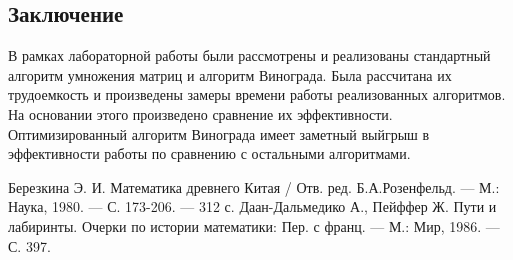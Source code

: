\documentclass[a4paper,12pt]{article}
\begin{document}
    \newpage

    \begin{center}
        \section*{Заключение}
    \end{center}
            \label{sec:ending}
        	\qquad В рамках лабораторной работы были рассмотрены и реализованы стандартный алгоритм умножения матриц и алгоритм Винограда. Была рассчитана их трудоемкость и произведены замеры времени работы реализованных алгоритмов. На основании этого произведено сравнение их эффективности. Оптимизированный алгоритм Винограда имеет заметный выйгрыш в эффективности работы по сравнению с остальными алгоритмами.
    \newpage

    \begin{center}        
        \begin{thebibliography}{}
        	  Березкина Э. И. Математика древнего Китая / Отв. ред. Б.А.Розенфельд. — М.: Наука, 1980. — С. 173-206. — 312 с.   
        	  Даан-Дальмедико А., Пейффер Ж. Пути и лабиринты. Очерки по истории математики: Пер. с франц. — М.: Мир, 1986. — С. 397.       	
        	
        \end{thebibliography}
    \end{center}
\end{document}
